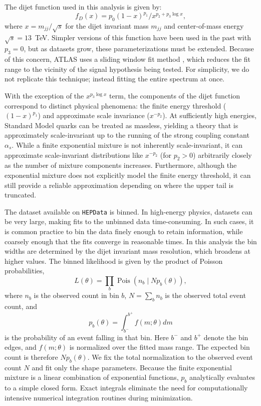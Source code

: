 \documentclass[a4paper,11pt]{article}
\begin{document}
The dijet function used in this analysis is given by:
\begin{equation}
f_D(x) = p_0(1-x)^{p_1}/x^{p_2+p_3\log x},
\end{equation}
where $x=m_{jj}/\sqrt{s}$ for the dijet invariant mass $m_{jj}$ and center-of-mass energy 
$\sqrt{s}=13$~TeV.
Simpler versions of this function have been used in the past with $p_3=0$, but as datasets grow, these parameterizations must be extended. Because of this concern, ATLAS uses a sliding window fit method \cite{ATLAT_Dijet_sliding_window}, which reduces the fit range to the vicinity of the signal hypothesis being tested. For simplicity, we do not replicate this technique; instead fitting the entire spectrum at once.

With the exception of the $x^{p_3\log x}$ term, the components of the dijet function correspond to distinct physical phenomena: the finite energy threshold ($(1-x)^{p_1}$) and approximate scale invariance ($x^{-p_2}$). At sufficiently high energies, Standard Model quarks can be treated as massless, yielding a theory that is approximately scale-invariant up to the running of the strong coupling constant $\alpha_s$. While a finite exponential mixture is not inherently scale-invariant, it can approximate scale-invariant distributions like $x^{-p_2}$ (for $p_2>0$) arbitrarily closely as the number of mixture components increases. Furthermore, although the exponential mixture does not explicitly model the finite energy threshold, it can still provide a reliable approximation depending on where the upper tail is truncated.

The dataset available on \texttt{HEPData} is binned. In high-energy physics, datasets can be very large, making fits to the unbinned data time-consuming. In such cases, it is common practice to bin the data finely enough to retain information, while coarsely enough that the fits converge in reasonable times. In this analysis the bin widths are determined by the dijet invariant mass resolution, which broadens at higher 
values. The binned likelihood is given by the product of Poisson probabilities,
\begin{equation}
L(\theta)=\prod_b \operatorname{Pois}\left(n_b\mid Np_b(\theta)\right),
\end{equation}
where $n_b$ is the observed count in bin $b$, $N=\sum_b n_b$ is the observed total event count, and
\begin{equation}
p_b(\theta)=\int_{b^-}^{b^+}f(m;\theta)dm
\end{equation}
is the probability of an event falling in that bin. Here $b^-$ and $b^+$ denote the bin edges, and $f(m;\theta)$ is normalized over the fitted mass range. The expected bin count is therefore $Np_b(\theta)$. We fix the total normalization to the observed event count $N$ and fit only the shape parameters. Because the finite exponential mixture is a linear combination of exponential functions, $p_b$ analytically evaluates to a simple closed form. Exact integrals eliminate the need for computationally intensive numerical integration routines during minimization.
\end{document}
